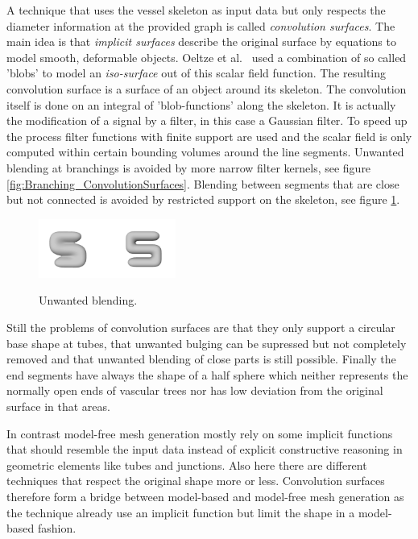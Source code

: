 A technique that uses the vessel skeleton as input data but only respects the diameter information at the provided graph is called \emph{convolution surfaces}. The main idea is that \emph{implicit surfaces} describe the original surface by equations to model smooth, deformable objects. Oeltze et al.~\cite{oeltze2005visualization} used a combination of so called 'blobs' to model an \emph{iso-surface} out of this scalar field function.
The resulting convolution surface is a surface of an object around its skeleton. The convolution itself is done on an integral of 'blob-functions' along the skeleton. It is actually the modification of a signal by a filter, in this case a Gaussian filter. To speed up the process filter functions with finite support are used and the scalar field is only computed within certain bounding volumes around the line segments. Unwanted blending at branchings is avoided by more narrow filter kernels, see figure \ref{fig:Branching_ConvolutionSurfaces}. Blending between segments that are close but not connected is avoided by restricted support on the skeleton, see figure \ref{fig:Blending_ConvolutionSurfaces}.

\begin{figure}[h]
	\centering
	\includegraphics[width=0.4\textwidth]{./Images/Blending_ConvolutionSurfaces.png} \\
	\caption{Unwanted blending.}
	\cite{oeltze2005visualization}
	\label{fig:Blending_ConvolutionSurfaces}
\end{figure}

Still the problems of convolution surfaces are that they only support a circular base shape at tubes, that unwanted bulging can be supressed but not completely removed and that unwanted blending of close parts is still possible. Finally the end segments have always the shape of a half sphere which neither represents the normally open ends of vascular trees nor has low deviation from the original surface in that areas.

In contrast model-free mesh generation mostly rely on some implicit functions that should resemble the input data instead of explicit constructive reasoning in geometric elements like tubes and junctions. Also here there are different techniques that respect the original shape more or less. Convolution surfaces therefore form a bridge between model-based and model-free mesh generation as the technique already use an implicit function but limit the shape in a model-based fashion.

